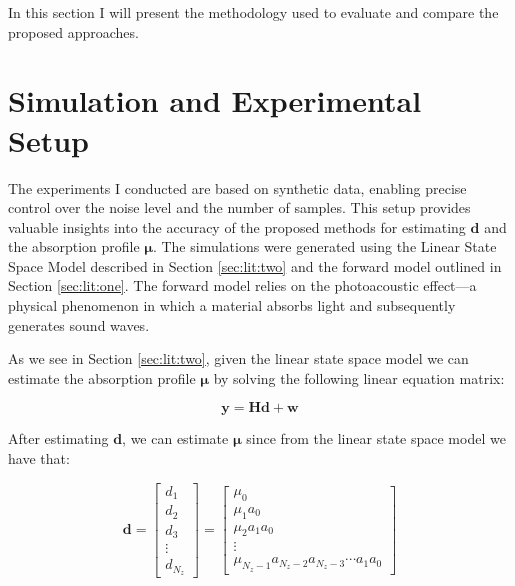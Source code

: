 In this section I will present the methodology used to evaluate and compare the proposed approaches.

\section{Simulation and Experimental Setup} \label{sec:method}

The experiments I conducted are based on synthetic data, enabling precise control over the noise level and the number of samples. This setup provides valuable insights into the accuracy of the proposed methods for estimating $\mathbf{d}$ and the absorption profile $\mathbf{\mu}$. The simulations were generated using the Linear State Space Model described in Section \ref{sec:lit:two} and the forward model outlined in Section \ref{sec:lit:one}. The forward model relies on the photoacoustic effect—a physical phenomenon in which a material absorbs light and subsequently generates sound waves.

As we see in Section \ref{sec:lit:two}, given the linear state space model we can estimate the absorption profile $\mathbf{\mu}$ by solving the following linear equation matrix:

\begin{equation} \label{eq:linear}
    \mathbf{y} = \mathbf{H} \mathbf{d} + \mathbf{w}
\end{equation}

After estimating $\mathbf{d}$, we can estimate $\mathbf{\mu}$ since from the linear state space model we have that:

\begin{equation}
    \mathbf{d} = \begin{bmatrix}
                    d_1 \\
                    d_2 \\
                    d_3 \\
                    \vdots \\
                    d_{N_z}    
                \end{bmatrix}
             =
                \begin{bmatrix}
                    \mu_0 \\
                    \mu_1 a_0 \\
                    \mu_2 a_1 a_0 \\
                    \vdots \\
                    \mu_{N_z -1} a_{N_z - 2} a_{N_z - 3} \cdots a_1 a_0
                \end{bmatrix}
\end{equation}

